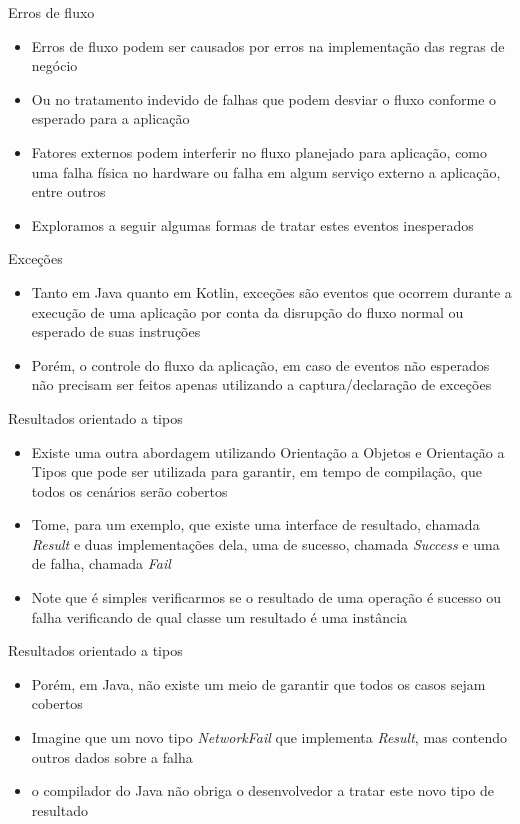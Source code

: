 \documentclass[brazilian]{beamer}
\begin{document}
\begin{frame}{Erros de fluxo}
    \begin{itemize}
        \item Erros de fluxo podem ser causados por erros na implementação das regras de negócio
        \item Ou no tratamento indevido de falhas que podem desviar o fluxo conforme o esperado para a aplicação
        \item Fatores externos podem interferir no fluxo planejado para aplicação, como uma falha física no hardware ou falha em algum serviço externo a aplicação, entre outros
        \item Exploramos a seguir algumas formas de tratar estes eventos inesperados
    \end{itemize}
\end{frame}

\begin{frame}{Exceções}
    \begin{itemize}
        \item Tanto em Java quanto em Kotlin, exceções são eventos que ocorrem durante a execução de uma aplicação por conta da disrupção do fluxo normal ou esperado de suas instruções
        \item Porém, o controle do fluxo da aplicação, em caso de eventos não esperados não precisam ser feitos apenas utilizando a captura/declaração de exceções
    \end{itemize}
\end{frame}

\begin{frame}[fragile]{Resultados orientado a tipos}
    \begin{itemize}
        \item Existe uma outra abordagem utilizando Orientação a Objetos e Orientação a Tipos que pode ser utilizada para garantir, em tempo de compilação, que todos os cenários serão cobertos
        \item Tome, para um exemplo, que existe uma interface de resultado, chamada \emph{Result} e duas implementações dela, uma de sucesso, chamada \emph{Success} e uma de falha, chamada \emph{Fail}
        \item Note que é simples verificarmos se o resultado de uma operação é sucesso ou falha verificando de qual classe um resultado é uma instância
    \end{itemize}
\end{frame}

\begin{frame}{Resultados orientado a tipos}
    \begin{itemize}
        \item Porém, em Java, não existe um meio de garantir que todos os casos sejam cobertos
        \item Imagine que um novo tipo \emph{NetworkFail} que implementa \emph{Result}, mas contendo outros dados sobre a falha
        \item o compilador do Java não obriga o desenvolvedor a tratar este novo tipo de resultado
    \end{itemize}
\end{frame}
\end{document}
